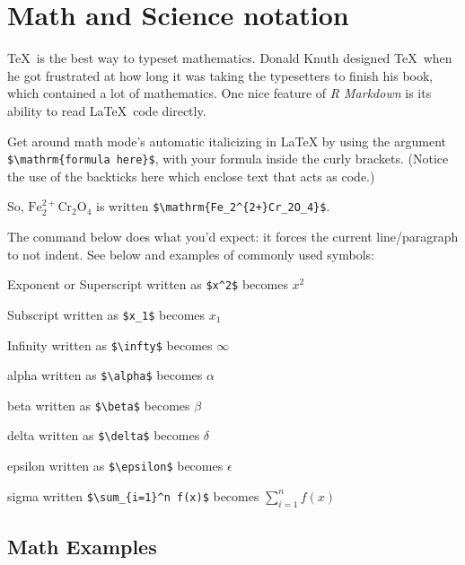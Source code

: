 \documentclass[12pt,oneside]{chicagocapstone}
\begin{document}
\hypertarget{math-sci}{%
\section*{Math and Science notation}\label{math-sci}}

\TeX~is the best way to typeset mathematics. Donald Knuth designed \TeX~when he got frustrated at how long it was taking the typesetters to finish his book, which contained a lot of mathematics. One nice feature of \emph{R Markdown} is its ability to read \LaTeX~code directly.

Get around math mode's automatic italicizing in LaTeX by using the argument \texttt{\$\textbackslash{}mathrm\{formula\ here\}\$}, with your formula inside the curly brackets. (Notice the use of the backticks here which enclose text that acts as code.)

So, \(\mathrm{Fe_2^{2+}Cr_2O_4}\) is written \texttt{\$\textbackslash{}mathrm\{Fe\_2\^{}\{2+\}Cr\_2O\_4\}\$}.

The \noindent command below does what you'd expect: it forces the current line/paragraph to not indent. See below and examples of commonly used symbols:

\noindent Exponent or Superscript written as \texttt{\$x\^{}2\$} becomes \(x^2\)

\noindent Subscript written as \texttt{\$x\_1\$} becomes \(x_1\)

\noindent Infinity written as \texttt{\$\textbackslash{}infty\$} becomes \(\infty\)

\noindent alpha written as \texttt{\$\textbackslash{}alpha\$} becomes \(\alpha\)

\noindent beta written as \texttt{\$\textbackslash{}beta\$} becomes \(\beta\)

\noindent delta written as \texttt{\$\textbackslash{}delta\$} becomes \(\delta\)

\noindent epsilon written as \texttt{\$\textbackslash{}epsilon\$} becomes \(\epsilon\)

\noindent sigma written \texttt{\$\textbackslash{}sum\_\{i=1\}\^{}n\ f(x)\$} becomes \(\sum_{i=1}^n f(x)\)

\hypertarget{math-examples}{%
\subsection*{Math Examples}\label{math-examples}}
\end{document}
